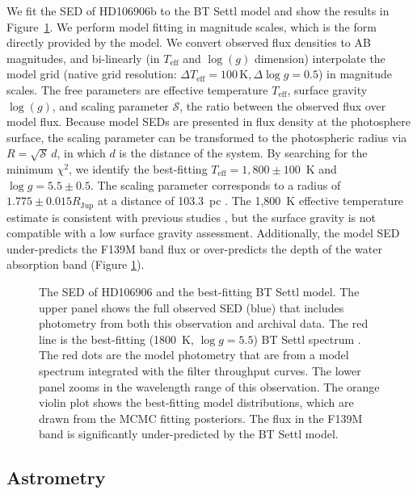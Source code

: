 \documentclass[twocolumn]{aastex62}
\newcommand{\teff}{\ensuremath{T_{\mathrm{eff}}}\xspace}
\newcommand{\logg}{\ensuremath{\log(g)}\xspace}
\begin{document}
We fit the SED of HD106906b to the BT Settl model \citep[][]{Allard2012} and show the results in Figure~\ref{fig:SED}. We perform model fitting in magnitude scales, which is the form directly provided by the model.  We convert observed flux {densities} to AB magnitudes, and bi-linearly (in \teff and \logg dimension) interpolate the model grid (native grid resolution: $\Delta \teff=100\,\mbox{K}, \Delta \log g=0.5$) in magnitude scales. The free parameters are effective temperature $\teff$, surface gravity $\logg$, and scaling parameter $\mathcal{S}$, the ratio between the observed flux over model flux. Because model SEDs are presented in flux {density} at the photosphere surface, the scaling parameter can be transformed to the photospheric radius via $R=\sqrt{\mathcal{S}}\,d$, in which $d$ is the distance of the system. By searching for the minimum $\chi^{2}$, we identify the best-fitting $T_{\mathrm{eff}}=1,800\pm100$~K and $\log g=5.5\pm0.5$.  The scaling parameter corresponds to a radius of  $1.775\pm0.015R_{\mathrm{Jup}}$ at a distance of 103.3~pc \citep{Gaia2018,Gaia2016}. The 1,800~K effective temperature estimate is consistent with previous studies \citep{Bailey2013,Wu2016}, but the surface gravity is not compatible with a low surface gravity assessment. Additionally, the model SED under-predicts the F139M band flux or over-predicts the depth of the water absorption band (Figure \ref{fig:SED}).

\begin{figure}
  \centering
{}
  \caption{The SED of HD106906 and the best-fitting BT Settl model. The upper panel shows the full observed SED (blue) that includes photometry from both this observation and archival data. The red line is the best-fitting (1800~K, $\log g=5.5$) BT Settl spectrum \citep[rebinned to $R\sim100$ in a flux conserved manner, ][]{Allard2012}. The red dots are the model photometry that are from a model spectrum integrated with the filter throughput curves. The lower panel zooms in the wavelength range of this observation. The orange violin plot shows the best-fitting model distributions, which are drawn from the MCMC fitting posteriors. The flux in the F139M band is significantly under-predicted by the BT Settl model.}
  \label{fig:SED}
\end{figure}

\subsection{Astrometry}
\label{sec:astrometry}
\end{document}
